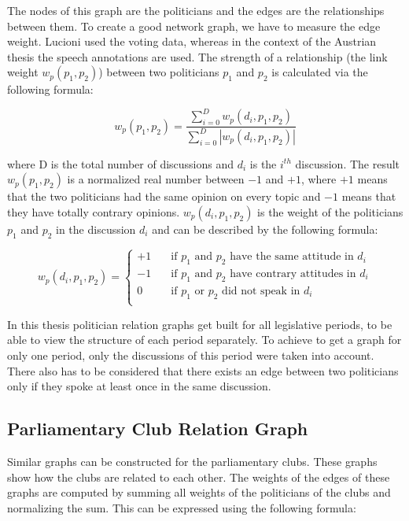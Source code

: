 The nodes of this graph are the politicians and the edges are the relationships between them. To create a good network graph, we have to measure the edge weight. Lucioni \cite{Lucioni_2015} used the voting data, whereas in the context of the Austrian thesis the speech annotations are used. The strength of a relationship (the link weight $w_p(p_1,p_2)$) between two politicians $p_1$ and $p_2$ is calculated via the following formula:

$$w_p(p_1,p_2) = \frac{\displaystyle\sum_{i=0}^{D} w_p(d_i,p_1,p_2)}{\displaystyle\sum_{i=0}^{D} |w_p(d_i,p_1,p_2)|}$$

where D is the total number of discussions and $d_i$ is the $i^{th}$ discussion. The result $w_p(p_1,p_2)$ is a normalized real number between $-1$ and $+1$, where $+1$ means that the two politicians had the same opinion on every topic and $-1$ means that they have totally contrary opinions. $w_p(d_i,p_1,p_2)$ is the weight of the politicians $p_1$ and $p_2$ in the discussion $d_i$ and can be described by the following formula:

$$w_p(d_i,p_1,p_2) = 
\begin{cases}
    +1       & \quad \text{if } p_1 \text{ and } p_2 \text{ have the same attitude in } d_i\\
    -1  & \quad \text{if } p_1 \text{ and } p_2 \text{ have contrary attitudes in } d_i\\
        0       & \quad \text{if } p_1 \text{ or } p_2 \text{ did not speak in } d_i\\
\end{cases}
$$

In this thesis politician relation graphs get built for all legislative periods, to be able to view the structure of each period separately. To achieve to get a graph for only one period, only the discussions of this period were taken into account. There also has to be considered that there exists an edge between two politicians only if they spoke at least once in the same discussion.

\subsection{Parliamentary Club Relation Graph}
\label{sec:club_relation_graph}
Similar graphs can be constructed for the parliamentary clubs. These graphs show how the clubs are related to each other. The weights of the edges of these graphs are computed by summing all weights of the politicians of the clubs and normalizing the sum. This can be expressed using the following formula:

